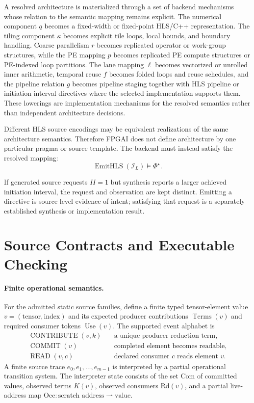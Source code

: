 \documentclass{article}
\begin{document}
A resolved architecture is materialized through a set of backend mechanisms whose relation to the semantic mapping remains explicit. The numerical component $q$ becomes a fixed-width or fixed-point HLS/C++ representation. The tiling component $\kappa$ becomes explicit tile loops, local bounds, and boundary handling. Coarse parallelism $r$ becomes replicated operator or work-group structures, while the PE mapping $p$ becomes replicated PE compute structures or PE-indexed loop partitions. The lane mapping $\ell$ becomes vectorized or unrolled inner arithmetic, temporal reuse $f$ becomes folded loops and reuse schedules, and the pipeline relation $g$ becomes pipeline staging together with HLS pipeline or initiation-interval directives where the selected implementation supports them. These lowerings are implementation mechanisms for the resolved semantics rather than independent architecture decisions.

Different HLS source encodings may be equivalent realizations of the same architecture semantics. Therefore FPGAI does not define architecture by one particular pragma or source template. The backend must instead satisfy the resolved mapping:
\begin{equation}
\operatorname{EmitHLS}(\mathcal{I}_{L})
\models
\Phi^\star.
\label{eq:hls-satisfies}
\end{equation}

If generated source requests $II=1$ but synthesis reports a larger achieved initiation interval, the request and observation are kept distinct. Emitting a directive is source-level evidence of intent; satisfying that request is a separately established synthesis or implementation result.

\section{Source Contracts and Executable Checking}
\label{sec:sourcecontracts}
\paragraph{Finite operational semantics.}
For the admitted static source families, define a finite typed tensor-element value $v=(\text{tensor},\text{index})$ and its expected producer contributions $\operatorname{Terms}(v)$ and required consumer tokens $\operatorname{Use}(v)$. The supported event alphabet is
\begin{align}
\operatorname{CONTRIBUTE}(v,k)&\quad\text{a unique producer reduction term},\\
\operatorname{COMMIT}(v)&\quad\text{completed element becomes readable},\\
\operatorname{READ}(v,c)&\quad\text{declared consumer $c$ reads element $v$}.
\label{eq:events}
\end{align}
A finite source trace $e_0,e_1,\ldots,e_{m-1}$ is interpreted by a partial operational transition system. The interpreter state consists of the set $\mathrm{Com}$ of committed values, observed terms $K(v)$, observed consumers $\mathrm{Rd}(v)$, and a partial live-address map $\mathrm{Occ}:\text{scratch address}\rightharpoonup\text{value}$.
\end{document}
